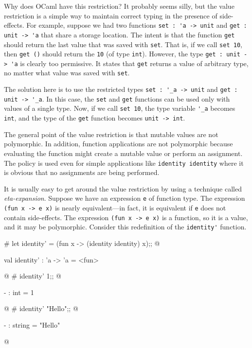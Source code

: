 Why does OCaml have this restriction?  It probably seems silly, but
the value restriction is a simple way to maintain correct typing in
the presence of side-effects.  For example, suppose we had two
functions \hbox{\hbox{\lstinline/set : 'a -> unit/}} and \hbox{\lstinline/get : unit -> 'a/} that
share a storage location.  The intent is that the function \hbox{\hbox{\lstinline/get/}}
should return the last value that was saved with \hbox{\hbox{\lstinline/set/}}.  That is,
if we call \hbox{\hbox{\lstinline/set 10/}}, then \hbox{\lstinline/get ()/} should return the
\hbox{\hbox{\lstinline/10/}} (of type \hbox{\lstinline/int/}).  However, the type 
\lstinline$get : unit -> 'a$
is clearly too permissive.  It states that \hbox{\hbox{\lstinline/get/}} returns a
value of arbitrary type, no matter what value was saved with
\hbox{\hbox{\lstinline/set/}}.

The solution here is to use the restricted types
\lstinline$set : '_a -> unit$
and \hbox{\hbox{\lstinline/get : unit -> '_a/}}.  In this case, the \hbox{\lstinline/set/} and
\hbox{\hbox{\lstinline/get/}} functions can be used only with values of a single type.
Now, if we call \hbox{\hbox{\lstinline/set 10/}}, the type variable \hbox{\lstinline/'_a/} becomes
\hbox{\hbox{\lstinline/int/}}, and the type of the \hbox{\lstinline/get/} function becomes
\lstinline$unit -> int$.

The general point of the value restriction is that mutable values
are not polymorphic.  In addition, function applications are not polymorphic
because evaluating the function might create a mutable value or perform an
assignment.  The policy is used even for simple applications like
\hbox{\hbox{\lstinline/identity identity/}} where it is obvious that no assignments are
being performed.

It is usually easy to get around the value restriction by
using a technique called \emph{eta-expansion}.  Suppose we have an
expression \hbox{\hbox{\lstinline/e/}} of function type.  The expression
\hbox{\lstinline$(fun x -> e x)$}
is nearly equivalent---in fact, it is equivalent if \hbox{\hbox{\lstinline/e/}}
does not contain side-effects.  The expression \hbox{\hbox{\lstinline/(fun x -> e x)/}}
is a function, so it is a value, and it may be polymorphic.  Consider
this redefinition of the \hbox{\hbox{\lstinline/identity'/}} function.

\begin{ocaml}
# let identity' = (fun x -> (identity identity) x);;
@
\begin{topoutput}
val identity' : 'a -> 'a = <fun>
\end{topoutput}
@
# identity' 1;;
@
\begin{topoutput}
- : int = 1
\end{topoutput}
@
# identity' "Hello";;
@
\begin{topoutput}
- : string = "Hello"
\end{topoutput}
@
\end{ocaml}


